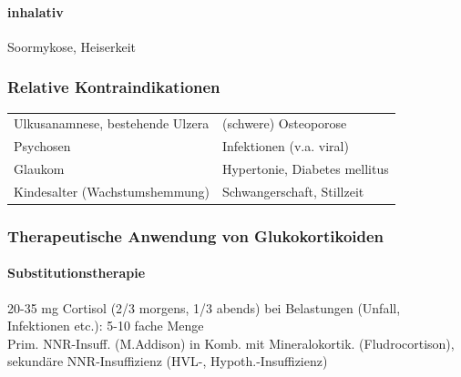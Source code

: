\documentclass[10pt,a4paper]{report}
\begin{document}
\paragraph{inhalativ} %
\label{subp:inhalativ}
Soormykose, Heiserkeit
\subsubsection{Relative Kontraindikationen} %
\label{par:relative_kontraindikationen}
\begin{tabularx}{\textwidth}{XX}
Ulkusanamnese, bestehende Ulzera&(schwere) Osteoporose\\
Psychosen&Infektionen (v.a. viral)\\
Glaukom&Hypertonie, Diabetes mellitus\\
Kindesalter (Wachstumshemmung)&Schwangerschaft, Stillzeit\\
\end{tabularx}
\subsubsection{Therapeutische Anwendung von Glukokortikoiden} %
\label{par:therapeutische_anwendung_von_glukokortikoiden}
\paragraph{Substitutionstherapie} %
\label{subp:substitutionstherapie}
20-35 mg Cortisol (2/3 morgens, 1/3 abends)
bei Belastungen (Unfall, Infektionen etc.): 5-10 fache Menge\\
Prim. NNR-Insuff. (M.Addison) in Komb. mit Mineralokortik. (Fludrocortison), sekundäre NNR-Insuffizienz (HVL-, Hypoth.-Insuffizienz)
\end{document}
